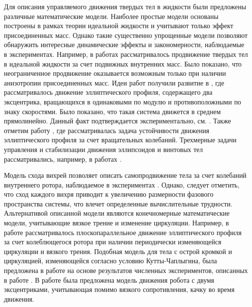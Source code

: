 Для описания управляемого движения твердых тел в жидкости были предложены различные математические модели. Наиболее простые модели основаны построены в рамках теории идеальной жидкости и учитывают только эффект присоединенных масс. Однако такие существенно упрощенные модели позволяют обнаружить интересные динамические эффекты и закономерности, наблюдаемые в экспериментах. Например, в работах \cite{Kozlov_Ramodanov_PMM_2001, Kozlov_Onichenko} рассматривалось продвижение твердых тел в идеальной жидкости за счет подвижных внутренних масс. Было показано, что неограниченное продвижение оказывается возможным только при наличии анизотропии присоединенных масс. Идеи работ \cite{Kozlov_Ramodanov_PMM_2001, Kozlov_Onichenko} получили развитие в \cite{Vetchanin_Kilin_2016}, где рассматривалось движение эллиптического профиля, содержащего два эксцентрика, вращающихся в одинаковыми по модулю и противоположными по знаку скоростями. Было показано, что такая система движется в среднем прямолинейно. Данный факт подтверждается экспериментально, см. \cite{Klenov_Kilin_2016}. Также отметим работу \cite{Jing_Kanso_2013}, где рассматривалась задача устойчивости движения эллиптического профиля за счет вращательных колебаний. Трехмерные задачи управления и стабилизации движения эллипсоидов и винтовых тел рассматривались, например, в работах \cite{Borisov_et_al_2017, Vetchanin_Mamaev_2017, Vetchanin_et_al_2016, Woolsey_Leonard_1999}.

Модель схода вихрей позволяет описать самопродвижение тела за счет колебаний внутреннего ротора, наблюдаемое в экспериментах \cite{Tallapragada_2015, Pollard_Tallapragada_2019}. Однако, следует отметить, что сход каждого вихря приводит к увеличению размерности фазового пространства системы, что влечет определенные вычислительные трудности. Альтернативой описанной модели являются конечномерные математические модели, учитывающие вязкое трение и изменение циркуляции. Например, в работе \cite{Borisov_et_al_2018} рассматривалось плоскопараллельное движение эллиптического профиля за счет колеблющегося ротора при наличии периодически изменяющейся циркуляции и вязкого трения. Подобная модель для тела с острой кромкой и циркуляцией, изменяющейся согласно условию Кутты-Чаплыгина, была предложена в работе \cite{Mamaev_Vetchanin_2018} на основе результатов численных экспериментов, описанных в работе \cite{Mamaev_et_al_2018}. В работе \cite{Kilin_et_al_2018} была предложена модель движения робота с двумя эксцентриками, учитывающая помимо вязкого сопротивления, качку во время движения.

